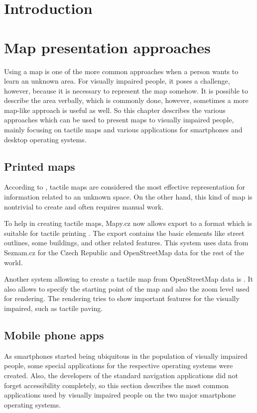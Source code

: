 \documentclass[nolof,digital]{fithesis3}
\begin{document}
\chapter{Introduction}
\chapter{Map presentation approaches}
Using a map is one of the more common approaches when a person wants to learn an unknown area. For visually impaired people, it poses a challenge, however, because it is necessary to represent the map somehow. It is possible to describe the area verbally, which is commonly done, however, sometimes a more map-like approach is useful as well. So this chapter describes the various approaches which can be used to present maps to visually impaired people, mainly focusing on tactile maps and various applications for smartphones and desktop operating systems.
\section{Printed maps}
According to \parencite{orientation_aids_from_foundations}, tactile maps are considered the most effective representation for information related to an unknown space. On the other hand, this kind of map is nontrivial to create and often requires manual work.

To help in creating tactile maps, Mapy.cz now allows export to a format which is suitable for tactile printing \parencite{mapycz}. The export contains the basic elements like street outlines, some buildings, and other related features. This system uses data from Seznam.cz for the Czech Republic and OpenStreetMap data for the rest of the world.

Another system allowing to create a tactile map from OpenStreetMap data is \parencite{tactile_osm_maps}. It also allows to specify the starting point of the map and also the zoom level used for rendering. The rendering tries to show important features for the visually impaired, such as tactile paving.
\section{Mobile phone apps}
As smartphones started being ubiquitous in the population of visually impaired people, some special applications for the respective operating systems were created. Also, the developers of the standard navigation applications did not forget accessibility completely, so this section describes the most common applications used by visually impaired people on the two major smartphone operating systems.
\end{document}
